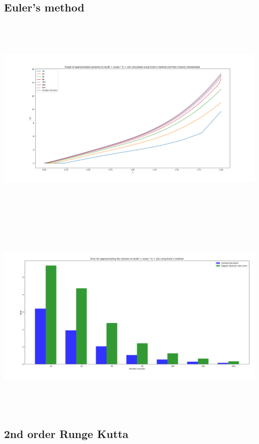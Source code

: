 \documentclass[10pt]{article}
\begin{document}
\subsection{Euler's method}
\label{sec:org35a2f47}
\begin{center}
\includegraphics[angle=0,height=10cm]{./img/euler_function.png}
\end{center}

\begin{center}
\includegraphics[angle=0,height=10cm]{./img/euler_error.png}
\end{center}


\subsection{2nd order Runge Kutta}
\label{sec:orgd8b3b71}
\end{document}
